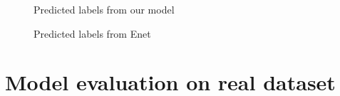 \documentclass[a4paper, 12pt, oneside, BCOR1cm,toc=chapterentrywithdots]{scrbook}
\begin{document}
\begin{figure}[h] 
\caption{Predicted labels from our model} \label{unityp}
\end{figure}

\begin{figure}[h] 
\caption{Predicted labels from Enet} \label{unityp2}
\end{figure}


\newpage

\section{Model evaluation on real dataset}
\end{document}
